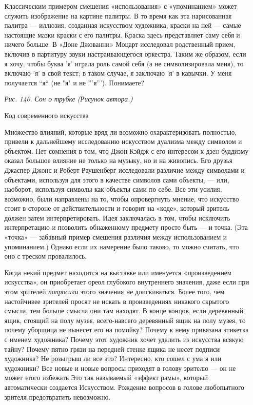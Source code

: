 Классическим примером смешения «использования» с «упоминанием» может служить изображение на картине палитры. В то время как эта нарисованная палитра --- иллюзия, созданная искусством художника, краски на ней --- самые настоящие мазки краски с его палитры. Краска здесь представляет саму себя и ничего больше. В «Доне Джованни» Моцарт исследовал родственный прием, включив в партитуру звуки настраивающегося оркестра. Таким же образом, если я хочу, чтобы буква 'я' играла роль самой себя (а не символизировала меня), то включаю 'я' в свой текст; в таком случае, я заключаю 'я' в кавычки. У меня получается ``я`` (не "я" и не '''я'''). Понимаете?

\emph{Рис. 140. Сон о трубке (Рисунок автора.)}

Код современного искусства

Множество влияний, которые вряд ли возможно охарактеризовать полностью, привели к дальнейшему исследованию искусством дуализма между символом и объектом. Нет сомнения в том, что Джон Кэйдж с его интересом к дзен-буддизму оказал большое влияние не только на музыку, но и на живопись. Его друзья Джаспер Джонс и Роберт Раушенберг исследовали различие между символами и объектами, используя для этого в качестве символов сами объекты, --- или, наоборот, используя символы как объекты сами по себе. Все эти усилия, возможно, были направлены на то, чтобы опровергнуть мнение, что искусство стоит в стороне от действительности и говорит на «коде», который зритель должен затем интерпретировать. Идея заключалась в том, чтобы исключить интерпретацию и позволить обнаженному предмету просто быть --- и точка. (Эта «точка» --- забавный пример смешения различия между использованием и упоминанием.) Однако если их намерение было таково, то можно считать, что оно с треском провалилось.

Когда некий предмет находится на выставке или именуется «произведением искусства», он приобретает ореол глубокого внутреннего значения, даже если при этом зрителей \emph{попросили} этого значения не доискиваться. Более того, чем настойчивее зрителей просят не искать в произведениях никакого скрытого смысла, тем больше смысла они там находят. В конце концов, если деревянный ящик, стоящий на полу музея, всего-навсего деревянный ящик на полу музея, то почему уборщица не вынесет его на помойку? Почему к нему привязана этикетка с именем художника? Почему этот художник хочет удалить из искусства всякую тайну? Почему пятно грязи на передней стенке ящика не несет подписи художника? Не розыгрыш ли все это? Интересно, кто сошел с ума я или художники? Все новые и новые вопросы приходят в голову зрителю --- он не может этого избежать Это так называемый «эффект рамы», который автоматически создается Искусством. Рождение вопросов в голове любопытного зрителя предотвратить невозможно.

